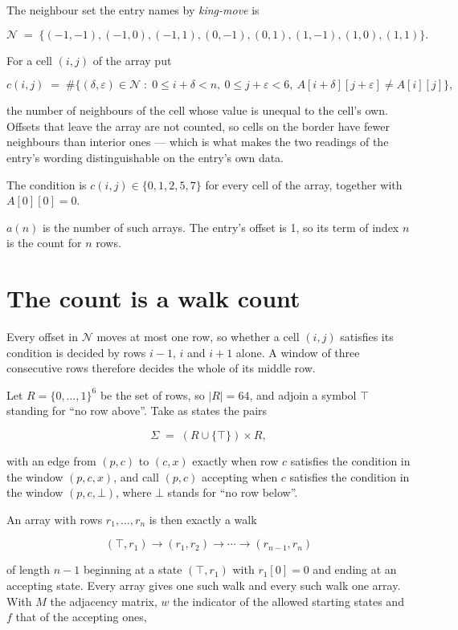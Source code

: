 \documentclass[11pt]{article}
\theoremstyle{definition}
\begin{document}
The neighbour set the entry names by {\itshape king-move} is

\[\mathcal{N} \;=\; \{(-1,-1), (-1,0), (-1,1), (0,-1), (0,1), (1,-1), (1,0), (1,1)\}.\]

For a cell $(i,j)$ of the array put

\[c(i,j) \;=\; \#\bigl\{(\delta,\varepsilon)\in\mathcal{N} \;:\; 0\le i+\delta<n,\ 0\le j+\varepsilon<6,\ A[i+\delta][j+\varepsilon] \neq A[i][j]\bigr\},\]

the number of neighbours of the cell whose value is unequal to the cell's own. Offsets that leave the array are not counted, so cells on the border have fewer neighbours than interior ones --- which is what makes the two readings of the entry's wording distinguishable on the entry's own data.

The condition is $c(i,j) \in \{0, 1, 2, 5, 7\}$ for every cell of the array, together with $A[0][0]=0$.

$a(n)$ is the number of such arrays. The entry's offset is 1, so its term of index $n$ is the count for $n$ rows.

\section{The count is a walk count}

Every offset in $\mathcal{N}$ moves at most one row, so whether a cell $(i,j)$ satisfies its condition is decided by rows $i-1$, $i$ and $i+1$ alone. A window of three consecutive rows therefore decides the whole of its middle row.

Let $R = \{0,\dots,1\}^{6}$ be the set of rows, so $|R| = 64$, and adjoin a symbol $\top$ standing for ``no row above''. Take as states the pairs

\[\Sigma \;=\; (R \cup \{\top\}) \times R,\]

with an edge from $(p,c)$ to $(c,x)$ exactly when row $c$ satisfies the condition in the window $(p,c,x)$, and call $(p,c)$ accepting when $c$ satisfies the condition in the window $(p,c,\bot)$, where $\bot$ stands for ``no row below''.

An array with rows $r_1,\dots,r_n$ is then exactly a walk

\[(\top,r_1) \to (r_1,r_2) \to \cdots \to (r_{n-1},r_n)\]

of length $n-1$ beginning at a state $(\top,r_1)$ with $r_1[0]=0$ and ending at an accepting state. Every array gives one such walk and every such walk one array. With $M$ the adjacency matrix, $w$ the indicator of the allowed starting states and $f$ that of the accepting ones,
\end{document}
